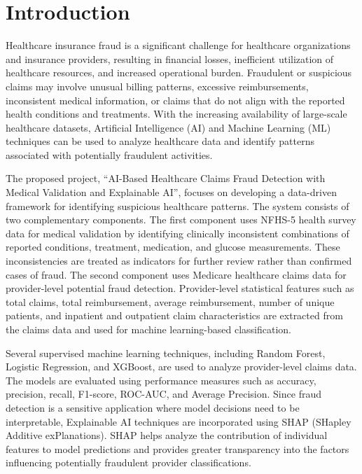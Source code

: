 \chapter{Introduction}

Healthcare insurance fraud is a significant challenge for healthcare organizations and insurance providers, resulting in financial losses, inefficient utilization of healthcare resources, and increased operational burden. Fraudulent or suspicious claims may involve unusual billing patterns, excessive reimbursements, inconsistent medical information, or claims that do not align with the reported health conditions and treatments. With the increasing availability of large-scale healthcare datasets, Artificial Intelligence (AI) and Machine Learning (ML) techniques can be used to analyze healthcare data and identify patterns associated with potentially fraudulent activities.

The proposed project, ``AI-Based Healthcare Claims Fraud Detection with Medical Validation and Explainable AI'', focuses on developing a data-driven framework for identifying suspicious healthcare patterns. The system consists of two complementary components. The first component uses NFHS-5 health survey data for medical validation by identifying clinically inconsistent combinations of reported conditions, treatment, medication, and glucose measurements. These inconsistencies are treated as indicators for further review rather than confirmed cases of fraud. The second component uses Medicare healthcare claims data for provider-level potential fraud detection. Provider-level statistical features such as total claims, total reimbursement, average reimbursement, number of unique patients, and inpatient and outpatient claim characteristics are extracted from the claims data and used for machine learning-based classification.

Several supervised machine learning techniques, including Random Forest, Logistic Regression, and XGBoost, are used to analyze provider-level claims data. The models are evaluated using performance measures such as accuracy, precision, recall, F1-score, ROC-AUC, and Average Precision. Since fraud detection is a sensitive application where model decisions need to be interpretable, Explainable AI techniques are incorporated using SHAP (SHapley Additive exPlanations). SHAP helps analyze the contribution of individual features to model predictions and provides greater transparency into the factors influencing potentially fraudulent provider classifications.

